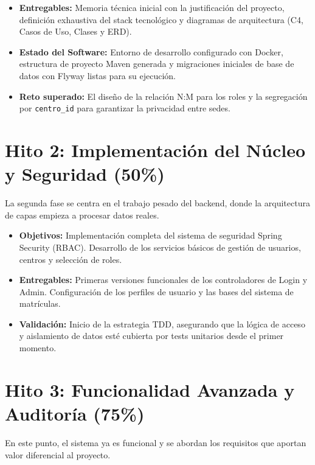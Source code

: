 \documentclass[12pt, a4paper]{report}
\begin{document}
\begin{itemize}
  \item \textbf{Entregables:} Memoria técnica inicial con la justificación del proyecto, definición exhaustiva del stack tecnológico y diagramas de arquitectura (C4, Casos de Uso, Clases y ERD).
  \item \textbf{Estado del Software:} Entorno de desarrollo configurado con Docker, estructura de proyecto Maven generada y migraciones iniciales de base de datos con Flyway listas para su ejecución.
  \item \textbf{Reto superado:} El dise\~no de la relación N:M para los roles y la segregación por \texttt{centro\_id} para garantizar la privacidad entre sedes.
\end{itemize}

\section{Hito 2: Implementación del Núcleo y Seguridad (50\%)}

La segunda fase se centra en el trabajo pesado del backend, donde la arquitectura de capas empieza a procesar datos reales.

\begin{itemize}
  \item \textbf{Objetivos:} Implementación completa del sistema de seguridad Spring Security (RBAC). Desarrollo de los servicios básicos de gestión de usuarios, centros y selección de roles.
  \item \textbf{Entregables:} Primeras versiones funcionales de los controladores de Login y Admin. Configuración de los perfiles de usuario y las bases del sistema de matrículas.
  \item \textbf{Validación:} Inicio de la estrategia TDD, asegurando que la lógica de acceso y aislamiento de datos esté cubierta por tests unitarios desde el primer momento.
\end{itemize}

\section{Hito 3: Funcionalidad Avanzada y Auditoría (75\%)}

En este punto, el sistema ya es funcional y se abordan los requisitos que aportan valor diferencial al proyecto.
\end{document}
